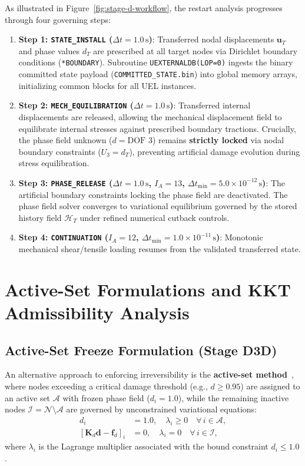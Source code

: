 As illustrated in Figure~\ref{fig:stage-d-workflow}, the restart analysis progresses through four governing steps:
\begin{enumerate}
    \item \textbf{Step 1: \texttt{STATE\_INSTALL} ($\Delta t = 1.0\,\text{s}$)}: Transferred nodal displacements $\mathbf{u}_T$ and phase values $d_T$ are prescribed at all target nodes via Dirichlet boundary conditions (\texttt{*BOUNDARY}). Subroutine \texttt{UEXTERNALDB(LOP=0)} ingests the binary committed state payload (\texttt{COMMITTED\_STATE.bin}) into global memory arrays, initializing common blocks for all UEL instances.
    \item \textbf{Step 2: \texttt{MECH\_EQUILIBRATION} ($\Delta t = 1.0\,\text{s}$)}: Transferred internal displacements are released, allowing the mechanical displacement field to equilibrate internal stresses against prescribed boundary tractions. Crucially, the phase field unknown ($d = \text{DOF 3}$) remains \textbf{strictly locked} via nodal boundary constraints ($U_3 = d_T$), preventing artificial damage evolution during stress equilibration.
    \item \textbf{Step 3: \texttt{PHASE\_RELEASE} ($\Delta t = 1.0\,\text{s}$, $I_A = 13$, $\Delta t_{\min} = 5.0\times 10^{-12}\,\text{s}$)}: The artificial boundary constraints locking the phase field are deactivated. The phase field solver converges to variational equilibrium governed by the stored history field $\mathcal{H}_T$ under refined numerical cutback controls.
    \item \textbf{Step 4: \texttt{CONTINUATION} ($I_A = 12$, $\Delta t_{\min} = 1.0\times 10^{-11}\,\text{s}$)}: Monotonic mechanical shear/tensile loading resumes from the validated transferred state.
\end{enumerate}

\section{Active-Set Formulations and KKT Admissibility Analysis}
\label{sec:transfer_active_set_kkt}

\subsection{Active-Set Freeze Formulation (Stage D3D)}
An alternative approach to enforcing irreversibility is the \textbf{active-set method}~\cite{heister2015}, where nodes exceeding a critical damage threshold (e.g., $d \ge 0.95$) are assigned to an active set $\mathcal{A}$ with frozen phase field ($d_i = 1.0$), while the remaining inactive nodes $\mathcal{I} = \mathcal{N} \setminus \mathcal{A}$ are governed by unconstrained variational equations:
\begin{align}
\label{eq:active_set_pde}
d_i &= 1.0, \quad \lambda_i \ge 0 \quad \forall \, i \in \mathcal{A}, \\
\left[ \mathbf{K}_d \mathbf{d} - \mathbf{f}_d \right]_i &= 0, \quad \lambda_i = 0 \quad \forall \, i \in \mathcal{I},
\end{align}
where $\lambda_i$ is the Lagrange multiplier associated with the bound constraint $d_i \le 1.0$.

